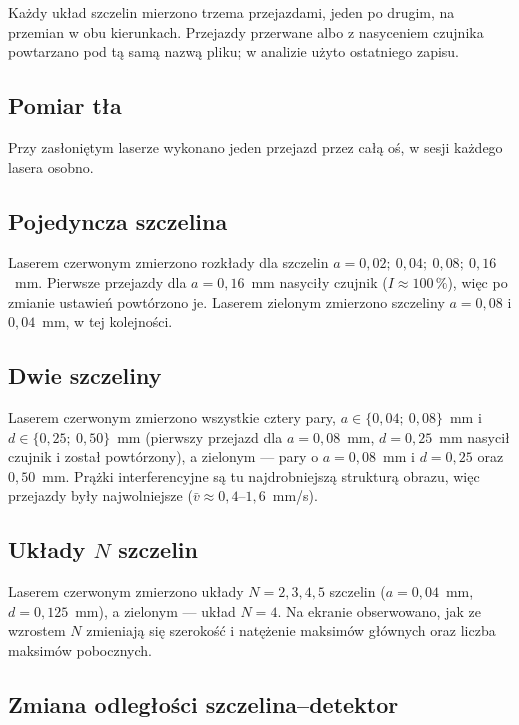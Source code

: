 \documentclass[12pt, a4paper]{article}
\begin{document}
Każdy układ szczelin mierzono trzema przejazdami, jeden po drugim, na przemian w obu
kierunkach. Przejazdy przerwane albo z nasyceniem czujnika powtarzano pod tą samą nazwą
pliku; w analizie użyto ostatniego zapisu.

\subsection{Pomiar tła}

Przy zasłoniętym laserze wykonano jeden przejazd przez całą oś, w sesji każdego lasera
osobno.

\subsection{Pojedyncza szczelina}

Laserem czerwonym zmierzono rozkłady dla szczelin $a = 0{,}02;\ 0{,}04;\ 0{,}08;\ 0{,}16$~mm.
Pierwsze przejazdy dla $a = 0{,}16$~mm nasyciły czujnik ($I \approx 100\,\%$), więc po
zmianie ustawień powtórzono je. Laserem zielonym zmierzono szczeliny $a = 0{,}08$
i $0{,}04$~mm, w tej kolejności.

\subsection{Dwie szczeliny}

Laserem czerwonym zmierzono wszystkie cztery pary, $a \in \{0{,}04;\ 0{,}08\}$~mm
i $d \in \{0{,}25;\ 0{,}50\}$~mm (pierwszy przejazd dla $a = 0{,}08$~mm, $d = 0{,}25$~mm
nasycił czujnik i został powtórzony), a zielonym --- pary o $a = 0{,}08$~mm
i $d = 0{,}25$ oraz $0{,}50$~mm. Prążki interferencyjne są tu najdrobniejszą strukturą
obrazu, więc przejazdy były najwolniejsze ($\bar v \approx 0{,}4$--$1{,}6$~mm/s).

\subsection{Układy $N$ szczelin}

Laserem czerwonym zmierzono układy $N = 2, 3, 4, 5$ szczelin ($a = 0{,}04$~mm,
$d = 0{,}125$~mm), a zielonym --- układ $N = 4$. Na ekranie obserwowano, jak ze wzrostem
$N$ zmieniają się szerokość i natężenie maksimów głównych oraz liczba maksimów pobocznych.

\subsection{Zmiana odległości szczelina--detektor}
\end{document}
